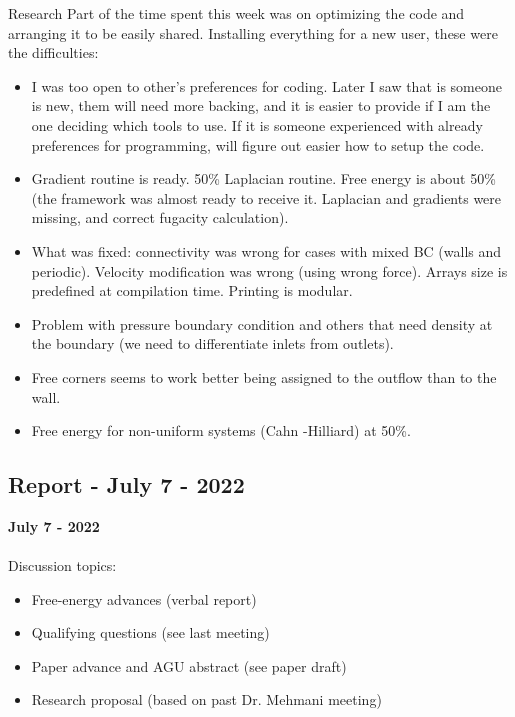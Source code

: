 \documentclass[8pt]{beamer}
\begin{document}
	\begin{frame}[t]{Research}
		Part of the time spent this week was on optimizing the code and arranging it to be easily shared. Installing everything for a new user, these were the difficulties:
		\begin{itemize}
			\item I was too open to other's preferences for coding. Later I saw that is someone is new, them will need more backing, and it is easier to provide if I am the one deciding which tools to use. If it is someone experienced with already preferences for programming, will figure out easier how to setup the code. 
			
			\item Gradient routine is ready. 50\% Laplacian routine. Free energy is about 50\% (the framework was almost ready to receive it. Laplacian and gradients were missing, and correct fugacity calculation). 
			
			\item What was fixed: connectivity was wrong for cases with mixed BC (walls and periodic). Velocity modification was wrong (using wrong force). Arrays size is predefined at compilation time. Printing is modular.  
			
			\item Problem with pressure boundary condition and others that need density at the boundary (we need to differentiate inlets from outlets). 
			
			\item Free corners seems to work better being assigned to the outflow than to the wall. 
			
			\item Free energy for non-uniform systems (Cahn -Hilliard) at 50\%. 
		\end{itemize}
	\end{frame}

	\subsection{Report - July 7 - 2022}
	\label{}
	\justifying
	\begin{frame}{}
		\textbf{July 7 - 2022}\\~\\
		Discussion topics:
		\begin{itemize}
			\item Free-energy advances (verbal report)
			\item Qualifying questions (see last meeting)
			\item Paper advance and AGU abstract (see paper draft)
			\item Research proposal (based on past Dr. Mehmani meeting)
		\end{itemize}
	\end{frame}
	
\end{document}
